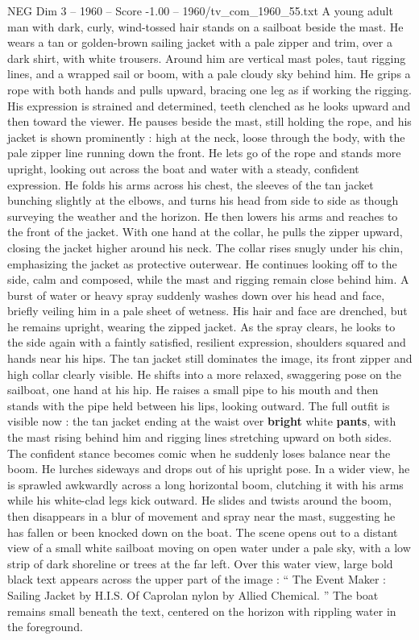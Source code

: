\begin{textsample}{NEG Dim 3 – 1960 – Score -1.00 – 1960/tv\_com\_1960\_55.txt}  \label{ex:f3_neg_076}
A young adult man with dark, curly, wind-tossed hair stands on a sailboat beside the mast.
He wears a tan or golden-brown sailing jacket with a pale zipper and trim, over a dark shirt, with white trousers.
Around him are vertical mast poles, taut rigging lines, and a wrapped sail or boom, with a pale cloudy sky behind him.
He grips a rope with both hands and pulls upward, bracing one leg as if working the rigging.
His expression is strained and determined, teeth clenched as he looks upward and then toward the viewer.
He pauses beside the mast, still holding the rope, and his jacket is shown prominently : high at the neck, loose through the body, with the pale zipper line running down the front.
He lets go of the rope and stands more upright, looking out across the boat and water with a steady, confident expression.
He folds his arms across his chest, the sleeves of the tan jacket bunching slightly at the elbows, and turns his head from side to side as though surveying the weather and the horizon.
He then lowers his arms and reaches to the front of the jacket.
With one hand at the collar, he pulls the zipper upward, closing the jacket higher around his neck.
The collar rises snugly under his chin, emphasizing the jacket as protective outerwear.
He continues looking off to the side, calm and composed, while the mast and rigging remain close behind him.
A burst of water or heavy spray suddenly washes down over his head and face, briefly veiling him in a pale sheet of wetness.
His hair and face are drenched, but he remains upright, wearing the zipped jacket.
As the spray clears, he looks to the side again with a faintly satisfied, resilient expression, shoulders squared and hands near his hips.
The tan jacket still dominates the image, its front zipper and high collar clearly visible.
He shifts into a more relaxed, swaggering pose on the sailboat, one hand at his hip.
He raises a small pipe to his mouth and then stands with the pipe held between his lips, looking outward.
The full outfit is visible now : the tan jacket ending at the waist over \textbf{bright} white \textbf{pants}, with the mast rising behind him and rigging lines stretching upward on both sides.
The confident stance becomes comic when he suddenly loses balance near the boom.
He lurches sideways and drops out of his upright pose.
In a wider view, he is sprawled awkwardly across a long horizontal boom, clutching it with his arms while his white-clad legs kick outward.
He slides and twists around the boom, then disappears in a blur of movement and spray near the mast, suggesting he has fallen or been knocked down on the boat.
The scene opens out to a distant view of a small white sailboat moving on open water under a pale sky, with a low strip of dark shoreline or trees at the far left.
Over this water view, large bold black text appears across the upper part of the image : “ The Event Maker : Sailing Jacket by H.I.S.
Of Caprolan nylon by Allied Chemical. ” The boat remains small beneath the text, centered on the horizon with rippling water in the foreground.

\end{textsample}
